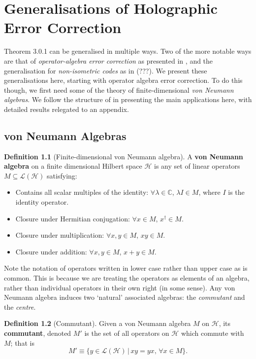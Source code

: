 \documentclass[12pt,a4paper]{report}
\numberwithin{equation}{section}
\theoremstyle{definition}
\newtheorem{definition}{Definition}[section]
\theoremstyle{theorem}
\theoremstyle{theorem}
\theoremstyle{example}
\theoremstyle{definition}
\begin{document}
\chapter{Generalisations of Holographic Error Correction}
Theorem 3.0.1 can be generalised in multiple ways. Two of the more notable ways are that of \textit{operator-algebra error correction} as presented in \cite{Harlow}, and the generalisation for \textit{non-isometric codes} as in (???). We present these generalisations here, starting with operator algebra error correction. To do this though, we first need some of the theory of finite-dimensional \textit{von Neumann algebras}. We follow the structure of \cite{Harlow} in presenting the main applications here, with detailed results relegated to an appendix.

\section{von Neumann Algebras}
\begin{definition}[Finite-dimensional von Neumann algebra]
	A \textbf{von Neumann algebra} on a finite dimensional Hilbert space $\mathcal{H}$ is any set of linear operators $M\subseteq\mathcal{L}(\mathcal{H})$ satisfying:
	\begin{itemize}
		\item Contains all scalar multiples of the identity: $\forall \lambda\in\mathbb{C}$, $\lambda I\in M$, where $I$ is the identity operator.
		\item Closure under Hermitian conjugation: $\forall x\in M$, $x^{\dagger}\in M$.
		\item Closure under multiplication: $\forall x,y\in M$, $xy\in M$.
		\item Closure under addition: $\forall x,y\in M$, $x+y\in M$.
	\end{itemize}
\end{definition}
Note the notation of operators written in lower case rather than upper case as is common. This is because we are treating the operators as elements of an algebra, rather than individual operators in their own right (in some sense). Any von Neumann algebra induces two `natural' associated algebras: the \textit{commutant} and the \textit{centre}.
\begin{definition}[Commutant]
	Given a von Neumann algebra $M$ on $\mathcal{H}$, its \textbf{commutant}, denoted $M'$ is the set of all operators on $\mathcal{H}$ which commute with $M$; that is
	\begin{equation}
		M'\equiv\{y\in\mathcal{L}(\mathcal{H})\,|\,xy=yx,\,\forall x\in M\}.
	\end{equation}
\end{definition}
\end{document}
